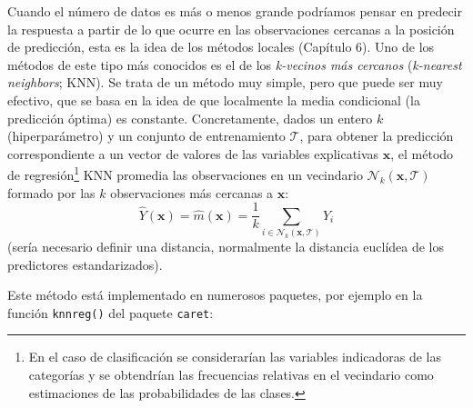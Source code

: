 \documentclass[
]{book}
\theoremstyle{break}
\theoremstyle{definition}
\theoremstyle{definition}
\theoremstyle{definition}
\theoremstyle{definition}
\theoremstyle{remark}
\begin{document}
Cuando el número de datos es más o menos grande podríamos pensar en predecir la respuesta a partir de lo que ocurre en las observaciones cercanas a la posición de predicción, esta es la idea de los métodos locales (Capítulo 6).
Uno de los métodos de este tipo más conocidos es el de los \emph{k-vecinos más cercanos} (\emph{k-nearest neighbors}; KNN).
Se trata de un método muy simple, pero que puede ser muy efectivo, que se basa en la idea de que localmente la media condicional (la predicción óptima) es constante.
Concretamente, dados un entero \(k\) (hiperparámetro) y un conjunto de entrenamiento \(\mathcal{T}\), para obtener la predicción correspondiente a un vector de valores de las variables explicativas \(\mathbf{x}\), el método de regresión\footnote{En el caso de clasificación se considerarían las variables indicadoras de las categorías y se obtendrían las frecuencias relativas en el vecindario como estimaciones de las probabilidades de las clases.} KNN promedia las observaciones en un vecindario \(\mathcal{N}_k(\mathbf{x}, \mathcal{T})\) formado por las \(k\) observaciones más cercanas a \(\mathbf{x}\):
\[\hat{Y}(\mathbf{x}) = \hat{m}(\mathbf{x}) = \frac{1}{k} \sum_{i \in \mathcal{N}_k(\mathbf{x}, \mathcal{T})} Y_i\]
(sería necesario definir una distancia, normalmente la distancia euclídea de los predictores estandarizados).

Este método está implementado en numerosos paquetes, por ejemplo en la función \texttt{knnreg()} del paquete \texttt{caret}:
\end{document}
